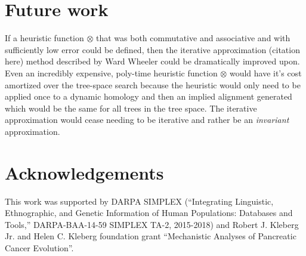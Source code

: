 \documentclass[11pt]{article}
\begin{document}
\section{Future work}
If a heuristic function $\otimes$ that was both commutative and associative and with sufficiently low error could be defined, then the iterative approximation (citation here) method described by Ward Wheeler could be dramatically improved upon. 
Even an incredibly expensive, poly-time heuristic function $\otimes$ would have it's cost amortized over the tree-space search because the heuristic would only need to be applied once to a dynamic homology and then an implied alignment generated which would be the same for all trees in the tree space. 
The iterative approximation would cease needing to be iterative and rather be an \emph{invariant} approximation.

\section{Acknowledgements}
This work was supported by DARPA SIMPLEX (``Integrating Linguistic, Ethnographic, and Genetic Information of Human Populations: Databases and Tools,'' DARPA-BAA-14-59 SIMPLEX TA-2, 2015-2018) and Robert J. Kleberg Jr. and Helen C. Kleberg foundation grant ``Mechanistic Analyses of Pancreatic Cancer Evolution''. 
\newpage

\end{document}
